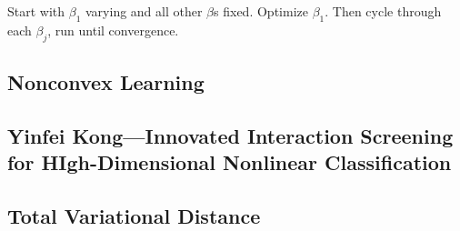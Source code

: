 Start with \(\beta_1\) varying and all other \(\beta\)s fixed. Optimize \(\beta_1\). Then cycle through each \(\beta_j\), run until convergence.

\subsection{Nonconvex Learning}

\subsection{Yinfei Kong---Innovated Interaction Screening for HIgh-Dimensional Nonlinear Classification}


\subsection{Total Variational Distance}



%
%
%
%
%
%
%
%
%

%
%
%




